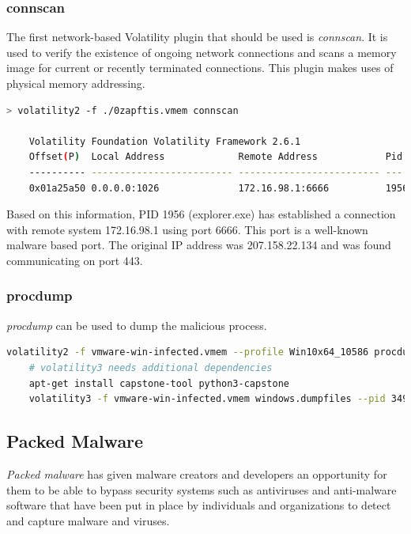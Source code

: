 \subsubsection{connscan}
The first network-based Volatility plugin that should be used is \textit{connscan}. It is used to verify the existence of ongoing network connections and scans a memory image for current or recently terminated connections. This plugin makes uses of physical memory addressing.

\begin{lstlisting}[language=bash]
    > volatility2 -f ./0zapftis.vmem connscan

    Volatility Foundation Volatility Framework 2.6.1
    Offset(P)  Local Address             Remote Address            Pid
    ---------- ------------------------- ------------------------- ---
    0x01a25a50 0.0.0.0:1026              172.16.98.1:6666          1956
\end{lstlisting}

Based on this information, PID 1956 (explorer.exe) has established a connection with remote system 172.16.98.1 using port 6666. This port is a well-known malware based port. The original IP address was 207.158.22.134 and was found communicating on port 443.


\subsubsection{procdump}
\textit{procdump} can be used to dump the malicious process.

\begin{lstlisting}[language=bash]
    volatility2 -f vmware-win-infected.vmem --profile Win10x64_10586 procdump --pid 3496 --dump-dir .
    # volatility3 needs additional dependencies
    apt-get install capstone-tool python3-capstone
    volatility3 -f vmware-win-infected.vmem windows.dumpfiles --pid 3496
\end{lstlisting}

\subsection{Packed Malware}
\textit{Packed malware} has given malware creators and developers an opportunity for them to be able to bypass security systems such as antiviruses and anti-malware software that have been put in place by individuals and organizations to detect and capture malware and viruses.\\


